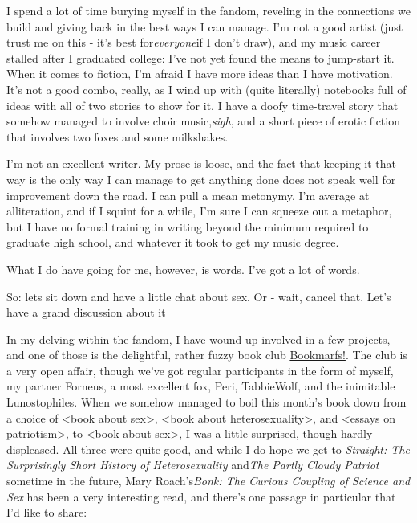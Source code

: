 
I spend a lot of time burying myself in the fandom, reveling in the connections we build and giving back in the best ways I can manage. I'm not a good artist (just trust me on this - it's best for\emph{everyone}if I don't draw), and my music career stalled after I graduated college: I've not yet found the means to jump-start it. When it comes to fiction, I'm afraid I have more ideas than I have motivation. It's not a good combo, really, as I wind up with (quite literally) notebooks full of ideas with all of two stories to show for it. I have a doofy time-travel story that somehow managed to involve choir music,\emph{sigh}, and a short piece of erotic fiction that involves two foxes and some milkshakes.

I'm not an excellent writer. My prose is loose, and the fact that keeping it that way is the only way I can manage to get anything done does not speak well for improvement down the road. I can pull a mean metonymy, I'm average at alliteration, and if I squint for a while, I'm sure I can squeeze out a metaphor, but I have no formal training in writing beyond the minimum required to graduate high school, and whatever it took to get my music degree.

What I do have going for me, however, is words. I've got a lot of words.

So: lets sit down and have a little chat about sex. Or - wait, cancel that. Let's have a grand discussion about it

In my delving within the fandom, I have wound up involved in a few projects, and one of those is the delightful, rather fuzzy book club \href{http://bookmarfs.com}{Bookmarfs!}. The club is a very open affair, though we've got regular participants in the form of myself, my partner Forneus, a most excellent fox, Peri, TabbieWolf, and the inimitable Lunostophiles. When we somehow managed to boil this month's book down from a choice of \textless{}book about sex\textgreater{}, \textless{}book about heterosexuality\textgreater{}, and \textless{}essays on patriotism\textgreater{}, to \textless{}book about sex\textgreater{}, I was a little surprised, though hardly displeased. All three were quite good, and while I do hope we get to \emph{Straight: The Surprisingly Short History of Heterosexuality} and\emph{The Partly Cloudy Patriot} sometime in the future, Mary Roach's\emph{Bonk: The Curious Coupling of Science and Sex} has been a very interesting read, and there's one passage in particular that I'd like to share:

